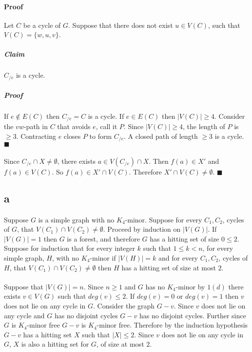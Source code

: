 \documentclass[letterpaper,12pt,oneside,onecolumn]{report}
\begin{document}
\paragraph{Proof}
Let $C$ be a cycle of $G$. Suppose that there does not exist $u \in V(C)$, such that $V(C) = \{w,u,v\}$.
\subparagraph{Claim}
$C_{/e}$ is a cycle.
\subparagraph{Proof}
If $e \not \in E(C)$ then $C_{/e} = C$ is a cycle. If $e \in E(C)$ then $|V(C)| \geq 4$. Consider the $vw$-path in $C$ that avoids $e$, call it $P$. Since $|V(C)| \geq 4$, the length of $P$ is $\geq 3$. Contracting $e$ closes $P$ to form $C_{/e}$. A closed path of length $\geq 3$ is a cycle. $\blacksquare$
\paragraph{}
Since $C_{/e} \cap X \neq \emptyset$, there exists $a \in V(C_{/e}) \cap X$. Then $f(a) \in X'$ and $f(a) \in  V(C)$. So $f(a) \in X' \cap V(C)$. Therefore $X' \cap V(C) \neq \emptyset$. $\blacksquare$
\subsection*{a}
\paragraph{}
Suppose $G$ is a simple graph with no $K_4$-minor. Suppose for every $C_1, C_2$, cycles of $G$, that $V(C_1) \cap V(C_2) \neq \emptyset$. Proceed by induction on $|V(G)|$. If $|V(G)|=1$ then $G$ is a forest, and therefore $G$ has a hitting set of size $0 \leq 2$. Suppose for induction that for every integer $k$ such that $1 \leq k < n$, for every simple graph, $H$, with no $K_4$-minor if $|V(H)| = k$ and for every $C_1, C_2$, cycles of $H$, that $V(C_1) \cap V(C_2) \neq \emptyset$ then $H$ has a hitting set of size at most $2$.
\paragraph{}
Suppose that $|V(G)| = n$. Since $n \geq 1$ and $G$ has no $K_4$-minor by $1(d)$ there exists $v \in V(G)$ such that $deg(v) \leq 2$. If $deg(v) = 0$ or $deg(v) = 1$ then $v$ does not lie on any cycle in $G$. Consider the graph $G - v$. Since $v$ does not lie on any cycle and $G$ has no disjoint cycles $G-v$ has no disjoint cycles. Further since $G$ is $K_4$-minor free $G-v$ is $K_4$-minor free. Therefore by the induction hypothesis $G-v$ has a hitting set $X$ such that $|X| \leq 2$. Since $v$ does not lie on any cycle in $G$, $X$ is also a hitting set for $G$, of size at most $2$.
\end{document}
